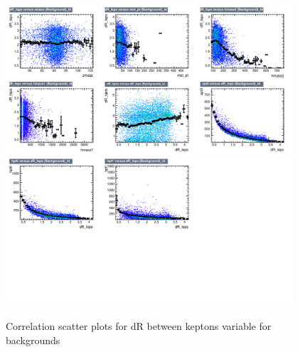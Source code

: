 \begin{figure}[!htb]%
\centering
\includegraphics[width=0.95\textwidth]{figures/CRDY/dataset/plots/correlationscatter_dR_leps__Id_c3.pdf}
\includegraphics[width=0.95\textwidth]{figures/CRDY/dataset/plots/correlationscatter_dR_leps__Id_c4.pdf}
\caption{ Correlation scatter plots for dR between keptons variable for backgrounds}%
\label{fig:correlations_CRDY_drleps_BG}                                                       
\end{figure}




